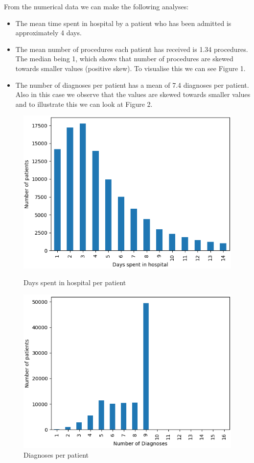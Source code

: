 \documentclass[11pt]{report}
\newcommand{\linespace}{\vspace{0.3cm}\noindent}
\begin{document}
\linespace
From the numerical data we can make the following analyses:

\begin{itemize}
	\item The mean time spent in hospital by a patient who has been admitted is approximately 4 days. 
	\item The mean number of procedures each patient has received is 1.34 procedures. The median being 1, which shows that number of procedures are skewed towards smaller values (positive skew). To visualise this we can see Figure 1.
	\item The number of diagnoses per patient has a mean of 7.4 diagnoses per patient. Also in this case we observe that the values are skewed towards smaller values and to illustrate this we can look at Figure 2. 
\end{itemize}

\begin{figure}[ht]
	\begin{minipage}[b]{.5\textwidth}
	\centering
	\includegraphics[width=1\textwidth]{tih_hist.png}
	\caption{Days spent in hospital per patient}
	\end{minipage}
	\hfill
	\begin{minipage}[b]{.5\textwidth}
	\centering
	\includegraphics[width=1\textwidth]{nod_bar.png}
\caption{Diagnoses per patient}
\end{minipage}
\end{figure}
\end{document}
